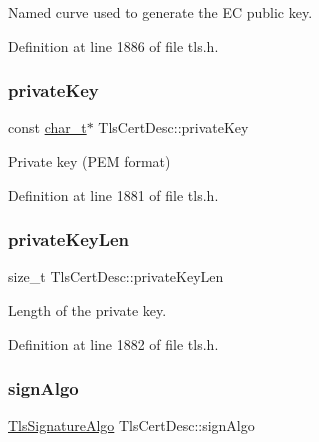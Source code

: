 Named curve used to generate the EC public key. 



Definition at line 1886 of file tls.\+h.

\mbox{\label{structTlsCertDesc_a3ae3164c84e83982d57e805167860459}} 
\subsubsection{\texorpdfstring{private\+Key}{privateKey}}
{\footnotesize\ttfamily const \hyperlink{compiler__port_8h_a40bb5262bf908c328fbcfbe5d29d0201}{char\+\_\+t}$\ast$ Tls\+Cert\+Desc\+::private\+Key}



Private key (P\+EM format) 



Definition at line 1881 of file tls.\+h.

\mbox{\label{structTlsCertDesc_a9e7c26f2f43e5192fd69b0d48f3558bd}} 
\subsubsection{\texorpdfstring{private\+Key\+Len}{privateKeyLen}}
{\footnotesize\ttfamily size\+\_\+t Tls\+Cert\+Desc\+::private\+Key\+Len}



Length of the private key. 



Definition at line 1882 of file tls.\+h.

\mbox{\label{structTlsCertDesc_a6859e171d20df5e0c0ec12b940d90822}} 
\subsubsection{\texorpdfstring{sign\+Algo}{signAlgo}}
{\footnotesize\ttfamily \hyperlink{tls_8h_abe6ce436cb0d777df29e0af7bf800223}{Tls\+Signature\+Algo} Tls\+Cert\+Desc\+::sign\+Algo}



